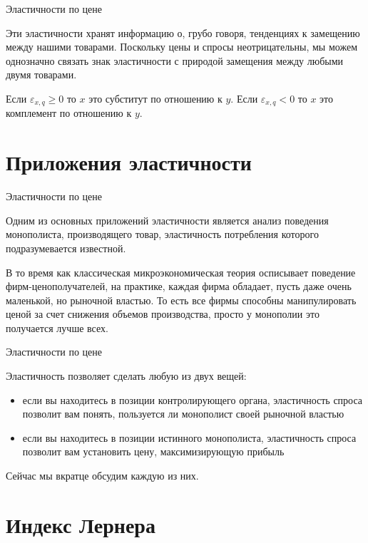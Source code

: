 \documentclass{beamer}
\begin{document}
\begin{frame}{Эластичности по цене}

Эти эластичности хранят информацию о, грубо говоря, тенденциях к замещению между нашими товарами. Поскольку цены и спросы неотрицательны, мы можем однозначно связать знак эластичности с природой замещения между любыми двумя товарами.

Если $\varepsilon_{x,q} \geqslant 0$ то $x$ это субститут по отношению к $y$. Если $\varepsilon_{x,q} < 0$ то $x$ это комплемент по отношению к $y$.

\end{frame}

\section{Приложения эластичности}

\begin{frame}{Эластичности по цене}

Одним из основных приложений эластичности является анализ поведения монополиста, производящего товар, эластичность потребления которого подразумевается известной.

В то время как классическая микроэкономическая теория осписывает поведение фирм-ценополучателей, на практике, каждая фирма обладает, пусть даже очень маленькой, но рыночной властью. То есть все фирмы способны манипулировать ценой за счет снижения объемов производства, просто у монополии это получается лучше всех.

\end{frame}

\begin{frame}{Эластичности по цене}

Эластичность позволяет сделать любую из двух вещей:

\begin{itemize}
\item если вы находитесь в позиции контролирующего органа, эластичность спроса позволит вам понять, пользуется ли монополист своей рыночной властью
\item если вы находитесь в позиции истинного монополиста, эластичность спроса позволит вам установить цену, максимизирующую прибыль
\end{itemize}

Сейчас мы вкратце обсудим каждую из них.

\end{frame}

\section{Индекс Лернера}
\end{document}
